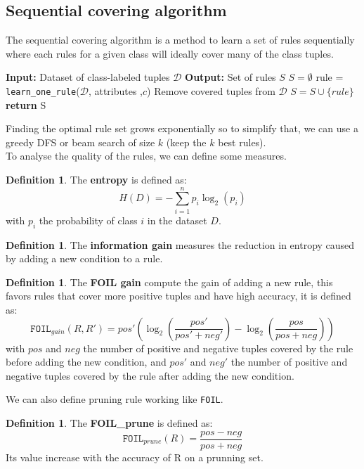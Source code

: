 \documentclass[12pt, openany]{report}
\theoremstyle{definition}
\newtheorem{definition}[thm]{Definition}
\begin{document}
\subsection{Sequential covering algorithm}
The sequential covering algorithm is a method to learn a set of rules sequentially where each rules for a given class will ideally cover many of the class tuples.
\begin{algorithm}[H]
    \caption{SequentialCovering algorithm}
    \begin{algorithmic}[1]
        \State \textbf{Input:} Dataset of class-labeled tuples $\mathcal{D}$
        \State \textbf{Output:} Set of rules $S$
        \State $S = \emptyset$
                \State rule = \texttt{learn\_one\_rule}($\mathcal{D}$, attributes ,$c$)
                \State Remove covered tuples from $\mathcal{D}$
                \State $S = S \cup \{rule\}$
            \EndWhile
        \EndFor
        \State \textbf{return} S
    \end{algorithmic}
\end{algorithm}
Finding the optimal rule set grows exponentially so to simplify that, we can use a greedy DFS or beam search of size $k$ (keep the $k$ best rules).\\
To analyse the quality of the rules, we can define some measures.
\begin{definition}
    The \textbf{entropy} is defined as:
    \begin{equation}
        H(D) = - \sum_{i=1}^{n} p_i \log_2 (p_i)
    \end{equation}
    with $p_i$ the probability of class $i$ in the dataset $D$.
\end{definition}
\begin{definition}
    The \textbf{information gain} measures the reduction in entropy caused by adding a new condition to a rule.
\end{definition}
\begin{definition}
    The \textbf{FOIL gain} compute the gain of adding a new rule, this favors rules that cover more positive tuples and have high accuracy, it is defined as:
    \begin{equation}
        \texttt{FOIL}_{gain}(R, R') = pos' \left( \log_2 \left( \frac{pos'}{pos' + neg'} \right) - \log_2 \left(\frac{pos}{pos + neg}\right) \right)
    \end{equation}
    with $pos$ and $neg$ the number of positive and negative tuples covered by the rule before adding the new condition, and $pos'$ and $neg'$ the number of positive and negative tuples covered by the rule after adding the new condition.
\end{definition}
We can also define pruning rule working like \texttt{FOIL}.
\begin{definition}
    The \textbf{FOIL\_prune} is defined as:
    \begin{equation}
        \texttt{FOIL}_{prune}(R) = \frac{pos - neg}{pos + neg}
    \end{equation}
    Its value increase with the accuracy of R on a prunning set.
\end{definition} 
\end{document}

